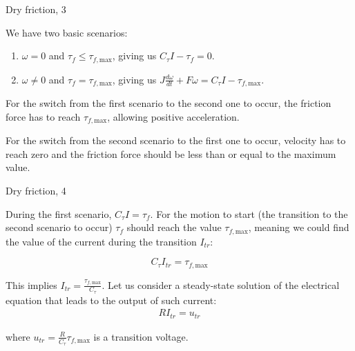 \documentclass{beamer}
\begin{document}
\begin{frame}{Dry friction, 3}
	\begin{flushleft}
		
		We have two basic scenarios:
		
		\begin{enumerate}
			\item $\omega = 0$ and $\tau_f \leq \tau_{f, \text{max}}$, giving us $C_\tau I - \tau_f = 0$.
			
			\item $\omega \neq 0$ and $\tau_f = \tau_{f, \text{max}}$, giving us $J \frac{d \omega}{dt} + F \omega = C_\tau I - \tau_{f, \text{max}}$.
		\end{enumerate}
		
		For the switch from the first scenario to the second one to occur, the friction force has to reach $\tau_{f, \text{max}}$, allowing positive acceleration.
		
		\bigskip
		
		For the switch from the second scenario to the first one to occur, velocity has to reach zero and the friction force should be less than or equal to the maximum value.
		
	\end{flushleft}
\end{frame}



\begin{frame}{Dry friction, 4}
	\begin{flushleft}
		
		During the first scenario, $C_\tau I = \tau_f$. For the motion to start (the transition to the second scenario to occur) $\tau_f$ should reach the value $\tau_{f, \text{max}}$, meaning we could find the value of the current during the transition $I_{tr}$:
		
		\begin{equation}
			C_\tau I_{tr} = \tau_{f, \text{max}}
		\end{equation}
		
		This implies $I_{tr} = \frac{\tau_{f, \text{max}}}{C_\tau}$.  Let us consider a steady-state solution of the electrical equation that leads to the output of such current:
		\begin{align}
			R I_{tr} = u_{tr}
		\end{align}
		
		where $u_{tr} = \frac{R}{C_\tau} \tau_{f, \text{max}}$ is a transition voltage.
		
	\end{flushleft}
\end{frame}
\end{document}
